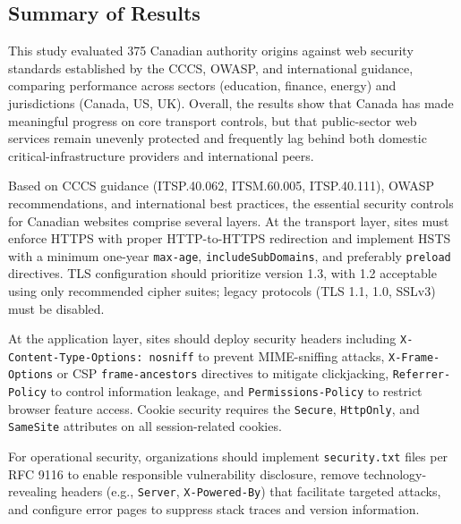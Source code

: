 \documentclass[pdflatex,sn-mathphys-num]{sn-jnl}
\numberwithin{equation}{section}
\theoremstyle{thmstyleone}
\theoremstyle{thmstyletwo}%
\theoremstyle{thmstylethree}%
\begin{document}
\subsection{Summary of Results}

This study evaluated 375 Canadian authority origins against web security standards established by the CCCS, 
OWASP, and international guidance, comparing performance across sectors (education, finance, energy) and 
jurisdictions (Canada, US, UK). Overall, the results show that Canada has made meaningful progress on core 
transport controls, but that public-sector web services remain unevenly protected and frequently lag behind 
both domestic critical-infrastructure providers and international peers.

\vspace{1em}Based on CCCS guidance (ITSP.40.062, ITSM.60.005, ITSP.40.111), OWASP recommendations, and 
international best 
practices, the essential security controls for Canadian websites comprise several layers. At the transport layer, 
sites must enforce HTTPS with proper HTTP-to-HTTPS redirection and implement HSTS with a minimum one-year 
\texttt{max-age}, \texttt{includeSubDomains}, and preferably \texttt{preload} directives. TLS configuration should 
prioritize version 1.3, with 1.2 acceptable using only recommended cipher suites; legacy protocols 
(TLS 1.1, 1.0, SSLv3) must be disabled.

\vspace{1em}At the application layer, sites should deploy security headers including \texttt{X-Content-Type-Options: nosniff} 
to prevent MIME-sniffing attacks, \texttt{X-Frame-Options} or CSP \texttt{frame-ancestors} directives to 
mitigate clickjacking, \texttt{Referrer-Policy} to control information leakage, and \texttt{Permissions-Policy} to 
restrict browser feature access. Cookie security requires the \texttt{Secure}, \texttt{HttpOnly}, and 
\texttt{SameSite} attributes on all session-related cookies.

\vspace{1em}For operational security, organizations should implement \texttt{security.txt} files per RFC 9116 to 
enable responsible vulnerability disclosure, remove technology-revealing headers (e.g., \texttt{Server}, 
\texttt{X-Powered-By}) 
that facilitate targeted attacks, and configure error pages to suppress stack traces and version information.
\end{document}
